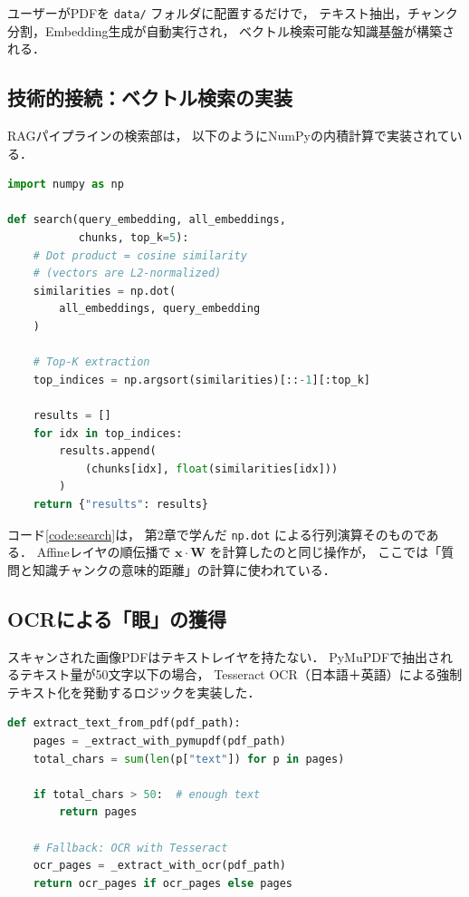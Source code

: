 \documentclass[uplatex, dvipdfmx, a4paper, 11pt]{jsarticle}
\begin{document}
ユーザーがPDFを \texttt{data/} フォルダに配置するだけで，
テキスト抽出，チャンク分割，Embedding生成が自動実行され，
ベクトル検索可能な知識基盤が構築される．

\subsection{技術的接続：ベクトル検索の実装}
RAGパイプラインの検索部は，
以下のようにNumPyの内積計算で実装されている．

\begin{lstlisting}[language=Python, caption=Vector Search via Dot Product, label=code:search]
import numpy as np

def search(query_embedding, all_embeddings,
           chunks, top_k=5):
    # Dot product = cosine similarity
    # (vectors are L2-normalized)
    similarities = np.dot(
        all_embeddings, query_embedding
    )

    # Top-K extraction
    top_indices = np.argsort(similarities)[::-1][:top_k]

    results = []
    for idx in top_indices:
        results.append(
            (chunks[idx], float(similarities[idx]))
        )
    return {"results": results}
\end{lstlisting}

コード\ref{code:search}は，
第2章で学んだ \texttt{np.dot} による行列演算そのものである．
Affineレイヤの順伝播で $\bm{x} \cdot \bm{W}$ を計算したのと同じ操作が，
ここでは「質問と知識チャンクの意味的距離」の計算に使われている．



\subsection{OCRによる「眼」の獲得}
スキャンされた画像PDFはテキストレイヤを持たない．
PyMuPDFで抽出されるテキスト量が50文字以下の場合，
Tesseract OCR（日本語＋英語）による強制テキスト化を発動するロジックを実装した．

\begin{lstlisting}[language=Python, caption=OCR Fallback Logic, label=code:ocr]
def extract_text_from_pdf(pdf_path):
    pages = _extract_with_pymupdf(pdf_path)
    total_chars = sum(len(p["text"]) for p in pages)

    if total_chars > 50:  # enough text
        return pages

    # Fallback: OCR with Tesseract
    ocr_pages = _extract_with_ocr(pdf_path)
    return ocr_pages if ocr_pages else pages
\end{lstlisting}
\end{document}
